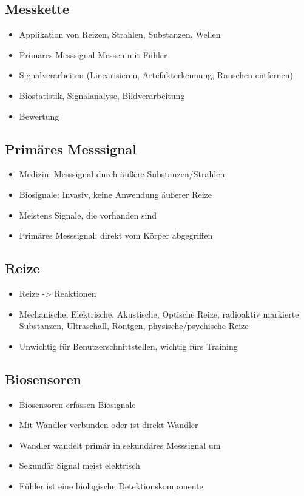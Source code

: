 \documentclass[a4paper,10pt,oneside]{article}
\begin{document}
\subsection{Messkette}
\begin{itemize}
	\item Applikation von Reizen, Strahlen, Substanzen, Wellen
	\item Primäres Messsignal Messen mit Fühler
	\item Signalverarbeiten (Linearisieren, Artefakterkennung, Rauschen entfernen)
	\item Biostatistik, Signalanalyse, Bildverarbeitung
	\item Bewertung
\end{itemize}


\subsection{Primäres Messsignal}
\begin{itemize}
	\item Medizin: Messsignal durch äußere Substanzen/Strahlen
	\item Biosignale: Invasiv, keine Anwendung äußerer Reize
	\item Meistens Signale, die vorhanden sind
	\item Primäres Messsignal: direkt vom Körper abgegriffen
\end{itemize}

\subsection{Reize}
\begin{itemize}
	\item Reize -> Reaktionen
	\item Mechanische, Elektrische, Akustische, Optische Reize, radioaktiv markierte Substanzen, Ultraschall, Röntgen, physische/psychische Reize
	\item Unwichtig für Benutzerschnittstellen, wichtig fürs Training
\end{itemize}

\subsection{Biosensoren}
\begin{itemize}
	\item Biosensoren erfassen Biosignale
	\item Mit Wandler verbunden oder ist direkt Wandler
	\item Wandler wandelt primär in sekundäres Messsignal um
	\item Sekundär Signal meist elektrisch
	\item Fühler ist eine biologische Detektionskomponente
\end{itemize}
\end{document}
